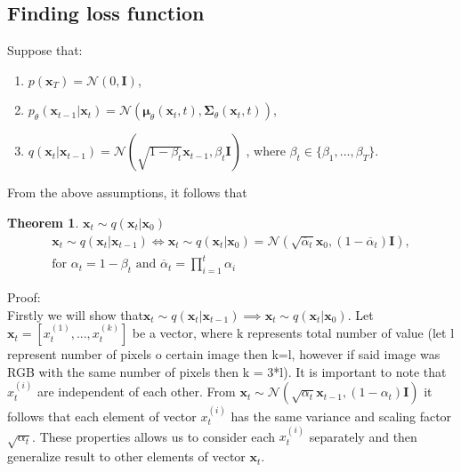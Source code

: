 \documentclass[10pt]{article}
\newtheorem{Twierdzenie}{Theorem}[section]
\begin{document}
\subsection{Finding loss function}
Suppose that:
\begin{enumerate}
\item $p(\textbf{x}_{T}) = \mathcal{N}(0, \mathbf{I})$,
\item  $p_{\theta}(\textbf{x}_{t-1}| \textbf{x}_{t}) =
        \mathcal{N}( \bm{\mu}_{\theta}(\textbf{x}_{t},t) ,\bm{\Sigma}_{\theta}(\textbf{x}_{t},t))$,
\item  $q(\textbf{x}_{t}| \textbf{x}_{t-1} ) = 
        \mathcal{N}( \sqrt{ 1 - \beta_{t}  }\textbf{x}_{t-1} ,\beta_{t}\mathbf{I} )$
        , where $\beta_t \in \{ \beta_{1}, ... , \beta_{T} \}$.
\end{enumerate}
From the above assumptions, it follows that 
\begin{Twierdzenie}\label{tw:markov_chain_gauss}
$\textbf{x}_{t} \sim  q(\textbf{x}_{t}| \textbf{x}_{0} )$  
\begin{gather*}
    \textbf{x}_{t} \sim  q(\textbf{x}_{t}| \textbf{x}_{t-1} )
    \iff
    \textbf{x}_{t} \sim  q(\textbf{x}_{t}| \textbf{x}_{0} ) = 
    \mathcal{N}( \sqrt{\overline{\alpha}_{t}} \textbf{x}_{0} , (1 - \overline{\alpha}_{t}) \mathbf{I} ), \\
    \text{for } \alpha_{t} = 1 - \beta_{t} \text{ and } \overline{\alpha}_{t} = \prod_{i=1}^{t}\alpha_{i} 
\end{gather*}
\end{Twierdzenie}
Proof: \\
Firstly we will show that$ \textbf{x}_{t} \sim  q(\textbf{x}_{t}| \textbf{x}_{t-1})
\implies
\textbf{x}_{t} \sim  q(\textbf{x}_{t}| \textbf{x}_{0} )$.
Let $\textbf{x}_{t} = [ x_{t}^{(1)}, ...  , x_{t}^{(k)} ]$ be a vector, where k represents total number of value (let l represent number of pixels o certain image then  k=l, however if said image was RGB with the same number of pixels then k = 3*l). It is important to note that $x_{t}^{(i)}$ are independent of each other. From
$\textbf{x}_{t} \sim \mathcal{N}( \sqrt{ \alpha_{t} }\textbf{x}_{t-1} ,(1 - \alpha_{t}) \mathbf{I} ) $ it follows that each element of vector $x_{t}^{(i)}$ has the same variance and scaling factor  $ \sqrt{ \alpha_{t} }$. These properties allows us to consider each $x_{t}^{(i)}$ separately and then generalize result to other elements of vector $\textbf{x}_{t}$.
\end{document}
